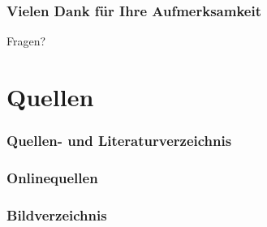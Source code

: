 \begin{frame}
    \frametitle{Vielen Dank für Ihre Aufmerksamkeit}

    \begin{center}
        Fragen?
    \end{center}
\end{frame}


\section{Quellen}

\begin{frame}[allowframebreaks]
    \frametitle{Quellen- und Literaturverzeichnis}

    \printbibliography[heading=none, notkeyword={image}, notkeyword={online}]    
\end{frame}

\begin{frame}[allowframebreaks]
    \frametitle{Onlinequellen}

    \printbibliography[heading=none, keyword={online}]    
\end{frame}

\begin{frame}[allowframebreaks]
    \frametitle{Bildverzeichnis}

    \printbibliography[heading=none, keyword={image}]
\end{frame}
